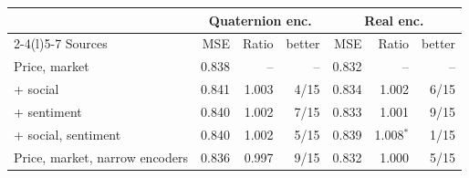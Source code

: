 
\begin{tabular}{@{}lrrrrrr@{}}
\toprule
 & \multicolumn{3}{c}{Quaternion enc.} & \multicolumn{3}{c}{Real enc.} \\
\cmidrule(lr){2-4}\cmidrule(l){5-7}
Sources & MSE & Ratio & better & MSE & Ratio & better \\
\midrule
Price, market & 0.838 & -- & -- & 0.832 & -- & -- \\
+ social & 0.841 & 1.003 & 4/15 & 0.834 & 1.002 & 6/15 \\
+ sentiment & 0.840 & 1.002 & 7/15 & 0.833 & 1.001 & 9/15 \\
+ social, sentiment & 0.840 & 1.002 & 5/15 & 0.839 & 1.008$^{*}$ & 1/15 \\
\addlinespace[2pt]
Price, market, narrow encoders & 0.836 & 0.997 & 9/15 & 0.832 & 1.000 & 5/15 \\
\bottomrule
\end{tabular}
